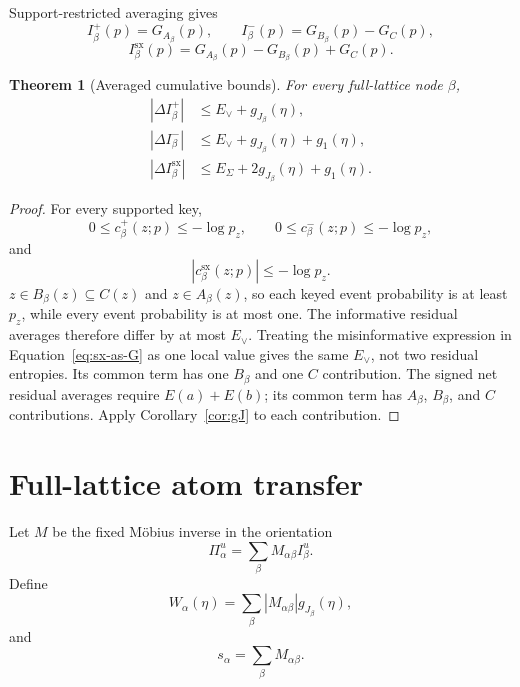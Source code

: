 \documentclass[11pt]{article}
\newtheorem{theorem}{Theorem}[section]
\theoremstyle{definition}
\newcommand{\sx}{\mathrm{sx}}
\begin{document}
Support-restricted averaging gives
\begin{equation}\label{eq:sx-as-G}
  I_\beta^+(p)=G_{A_\beta}(p),
  \qquad
  I_\beta^-(p)=G_{B_\beta}(p)-G_C(p),
\end{equation}
\begin{equation}
  I_\beta^{\sx}(p)
  =
  G_{A_\beta}(p)-G_{B_\beta}(p)+G_C(p).
\end{equation}

\begin{theorem}[Averaged cumulative bounds]\label{thm:cumulative}
For every full-lattice node \(\beta\),
\begin{align}
  |\Delta I_\beta^+|
  &\le E_\vee+g_{J_\beta}(\eta),\label{eq:c-plus}\\
  |\Delta I_\beta^-|
  &\le E_\vee+g_{J_\beta}(\eta)+g_1(\eta),\label{eq:c-minus}\\
  |\Delta I_\beta^\sx|
  &\le E_\Sigma+2g_{J_\beta}(\eta)+g_1(\eta).\label{eq:c-net}
\end{align}
\end{theorem}

\begin{proof}
For every supported key,
\begin{equation}\label{eq:local-ranges}
  0\le c_\beta^+(z;p)\le-\log p_z,
  \qquad
  0\le c_\beta^-(z;p)\le-\log p_z,
\end{equation}
and
\begin{equation}
  |c_\beta^\sx(z;p)|\le-\log p_z.
\end{equation}
\(z\in B_\beta(z)\subseteq C(z)\) and \(z\in A_\beta(z)\), so each keyed event probability is at
least \(p_z\), while every event probability is at most one.
The informative residual averages therefore differ by at most \(E_\vee\).  Treating the
misinformative expression in Equation~\eqref{eq:sx-as-G} as one local value gives the same
\(E_\vee\), not two residual entropies.  Its common term has one \(B_\beta\) and one \(C\)
contribution.  The signed net residual averages require \(E(a)+E(b)\); its common term has
\(A_\beta\), \(B_\beta\), and \(C\) contributions.  Apply
Corollary~\ref{cor:gJ} to each contribution.
\end{proof}

\section{Full-lattice atom transfer}

Let \(M\) be the fixed M{\"o}bius inverse in the orientation
\begin{equation}
  \Pi_\alpha^u=\sum_\beta M_{\alpha\beta}I_\beta^u.
\end{equation}
Define
\begin{equation}
  W_\alpha(\eta)=
  \sum_\beta|M_{\alpha\beta}|g_{J_\beta}(\eta),
\end{equation}
and
\begin{equation}
  s_\alpha=\sum_\beta M_{\alpha\beta}.
\end{equation}
\end{document}
